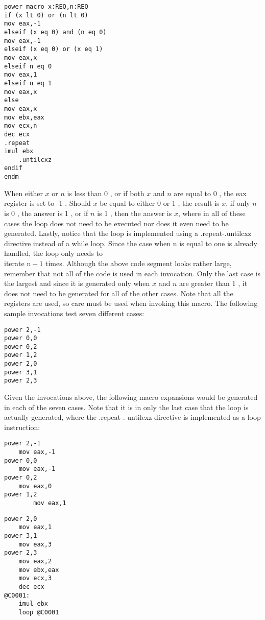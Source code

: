 \documentclass[10pt]{article}
\begin{document}
\begin{verbatim}
power macro x:REQ,n:REQ
if (x lt 0) or (n lt 0)
mov eax,-1
elseif (x eq 0) and (n eq 0)
mov eax,-1
elseif (x eq 0) or (x eq 1)
mov eax,x
elseif n eq 0
mov eax,1
elseif n eq 1
mov eax,x
else
mov eax,x
mov ebx,eax
mov ecx,n
dec ecx
.repeat
imul ebx
    .untilcxz
endif
endm
\end{verbatim}

When either $x$ or $n$ is less than 0 , or if both $x$ and $n$ are equal to 0 , the eax register is set to -1 . Should $x$ be equal to either 0 or 1 , the result is $x$, if only $n$ is 0 , the answer is 1 , or if $n$ is 1 , then the answer is $x$, where in all of these cases the loop does not need to be executed nor does it even need to be generated. Lastly, notice that the loop is implemented using a .repeat-.untilcxz directive instead of a while loop. Since the case when n is equal to one is already handled, the loop only needs to\\
iterate $\mathrm{n}-1$ times. Although the above code segment looks rather large, remember that not all of the code is used in each invocation. Only the last case is the largest and since it is generated only when $x$ and $n$ are greater than 1 , it does not need to be generated for all of the other cases. Note that all the registers are used, so care must be used when invoking this macro. The following sample invocations test seven different cases:

\begin{verbatim}
power 2,-1
power 0,0
power 0,2
power 1,2
power 2,0
power 3,1
power 2,3
\end{verbatim}

Given the invocations above, the following macro expansions would be generated in each of the seven cases. Note that it is in only the last case that the loop is actually generated, where the .repeat-. untilcxz directive is implemented as a loop instruction:

\begin{verbatim}
power 2,-1
    mov eax,-1
power 0,0
    mov eax,-1
power 0,2
    mov eax,0
power 1,2
        mov eax,1
\end{verbatim}

\begin{verbatim}
power 2,0
    mov eax,1
power 3,1
    mov eax,3
power 2,3
    mov eax,2
    mov ebx,eax
    mov ecx,3
    dec ecx
@C0001:
    imul ebx
    loop @C0001
\end{verbatim}
\end{document}
